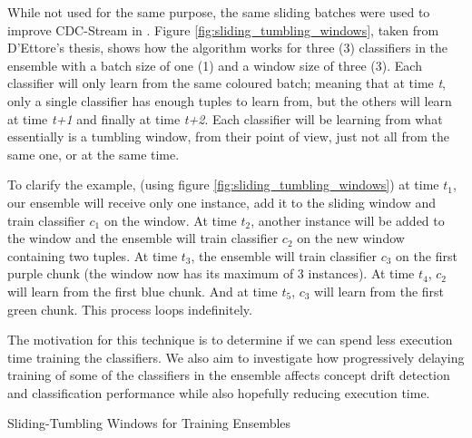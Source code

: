 While not used for the same purpose, the same sliding batches were used to improve CDC-Stream in \citep{d2016fine,d2017context}. Figure \ref{fig:sliding_tumbling_windows}, taken from D'Ettore's thesis, shows how the algorithm works for three (3) classifiers in the ensemble with a batch size of one (1) and a window size of three (3). Each classifier will only learn from the same coloured batch; meaning that at time \textit{t}, only a single classifier has enough tuples to learn from, but the others will learn at time \textit{t+1} and finally at time \textit{t+2}. Each classifier will be learning from what essentially is a tumbling window, from their point of view, just not all from the same one, or at the same time. 

To clarify the example, (using figure \ref{fig:sliding_tumbling_windows}) at time $t_1$, our ensemble will receive only one instance, add it to the sliding window and train classifier $c_1$ on the window. At time $t_2$, another instance will be added to the window and the ensemble will train classifier $c_2$ on the new window containing two tuples. At time $t_3$, the ensemble will train classifier $c_3$ on the first purple chunk (the window now has its maximum of 3 instances). At time $t_4$, $c_2$ will learn from the first blue chunk. And at time $t_5$, $c_3$ will learn from the first green chunk. This process loops indefinitely. 

The motivation for this technique is to determine if we can spend less execution time training the classifiers. We also aim to investigate how progressively delaying training of some of the classifiers in the ensemble affects concept drift detection and classification performance while also hopefully reducing execution time.

\begin{algorithm}
\caption{Sliding-Tumbling Windows for Training Ensembles\label{alg:sliding_tumbling_windows}}
\end{algorithm}

